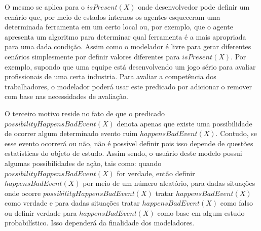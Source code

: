 O mesmo se aplica para o $isPresent(X)$ onde desenvolvedor pode definir um cenário que, por meio de estados internos os agentes esqueceram uma determinada ferramenta em um certo local ou, por exemplo, que o agente apresenta um algoritmo para determinar qual ferramenta é a mais apropriada para uma dada condição. Assim como o modelador é livre para gerar diferentes cenários simplesmente por definir valores diferentes para $isPresent(X)$. Por exemplo, supondo que uma equipe está desenvolvendo um jogo sério para avaliar profissionais de uma certa industria. Para avaliar a competência dos trabalhadores, o modelador poderá usar este predicado por adicionar o remover com base nas necessidades de avaliação.

O terceiro motivo reside no fato de que o predicado $possibilityHappensBadEvent(X)$ denota apenas que existe uma possibilidade de ocorrer algum determinado evento ruim  $happensBadEvent(X)$. Contudo, se esse evento ocorrerá ou não, não é possível definir pois isso depende de questões estatísticas do objeto de estudo. Assim sendo, o usuário deste modelo possui algumas possibilidades de ação, tais como: quando $possibilityHappensBadEvent(X)$  for verdade, então definir $happensBadEvent(X)$ por meio de um número aleatório, para dadas situações onde ocorre $possibilityHappensBadEvent(X)$ tratar $happensBadEvent(X)$ como verdade e para dadas situações tratar $happensBadEvent(X)$ como falso ou definir verdade para $happensBadEvent(X)$ como base em algum estudo probabilístico. Isso dependerá da finalidade dos modeladores. 